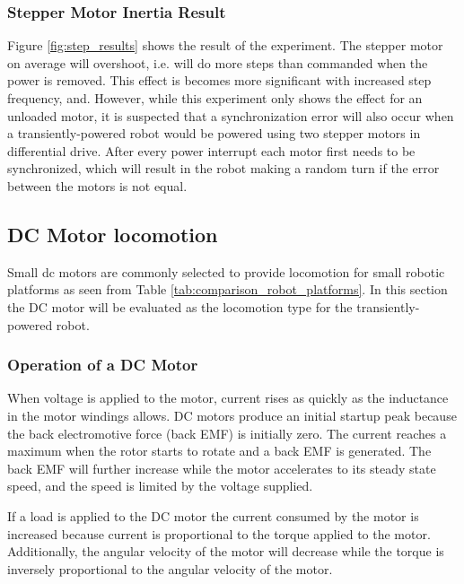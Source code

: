 

\subsubsection{Stepper Motor Inertia Result}

Figure \ref{fig:step_results} shows the result of the experiment.
The stepper motor on average will overshoot, i.e. will do more steps than commanded when the power is removed.
This effect is becomes more significant with increased step frequency, and.
However, while this experiment only shows the effect for an unloaded motor, it is suspected that a synchronization error will also occur when a transiently-powered robot would be powered using two stepper motors in differential drive.
After every power interrupt each motor first needs to be synchronized, which will result in the robot making a random turn if the error between the motors is not equal.

\subsection{DC Motor locomotion}
\label{sec:pre_dc_motor_locomotion}
Small dc motors are commonly selected to provide locomotion for small robotic platforms as seen from Table \ref{tab:comparison_robot_platforms}.
In this section the DC motor will be evaluated as the locomotion type for the transiently-powered robot.

\subsubsection{Operation of a DC Motor}

When voltage is applied to the motor, current rises as quickly as the inductance in the motor windings allows.
DC motors produce an initial startup peak because the back electromotive force (back EMF) is initially zero.
The current reaches a maximum when the rotor starts to rotate and a back EMF is generated.
The back EMF will further increase while the motor accelerates to its steady state speed, and the speed is limited by the voltage supplied.

If a load is applied to the DC motor the current consumed by the motor is increased because current is proportional to the torque applied to the motor.
Additionally, the angular velocity of the motor will decrease while the torque is inversely proportional to the angular velocity of the motor.

